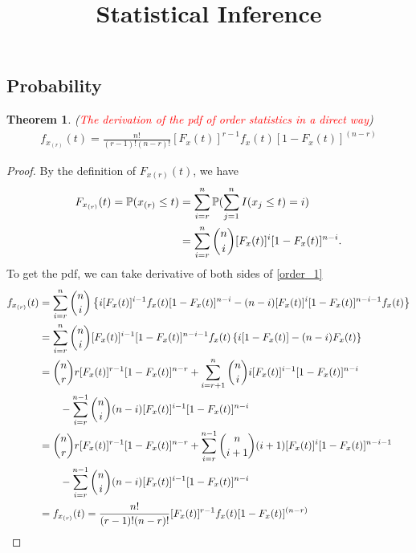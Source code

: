 \documentclass{article}
\title{\textbf{Statistical Inference}}
\author{}
\date{}
\begin{document}
\begin{CJK}{UTF8}{gbsn}

    \maketitle
    \newtheorem{Inference}{Theorem}[section]

    \section{Probability}

    \begin{Inference}
        (\textcolor{red}{\textit{The derivation of the pdf of order statistics in a direct way}})
        \begin{align}
            f_{x_{(r)}}(t)=\frac{n!}{(r-1)!(n-r)!}[F_x(t)]^{r-1}f_{x}(t)[1-F_x(t)]^{(n-r)}
        \end{align}
    \end{Inference}
    \begin{proof}
        By the definition of $F_{x(r)}(t)$, we have
        \begin{align}
            F_{x_{(r)}}(t) = \mathbb{P}(x_{(r)}\leq t) & = \sum_{i=r}^n\mathbb{P}(\sum_{j=1}^n I (x_j\leq t) = i)\notag         \\
                                                       & = \sum_{i=r}^n \binom{n}{i} [F_x(t)]^i[1-F_x(t)]^{n-i}.\label{order_1}
        \end{align}
        To get the pdf, we can take derivative of both sides of \eqref{order_1}
        \begin{align}
            f_{x_{(r)}}(t) & = \sum_{i=r}^n \binom{n}{i} \left \{ i[F_x(t)]^{i-1}f_x(t)[1-F_x(t)]^{n-i}-(n-i)[F_x(t)]^i[1-F_x(t)]^{n-i-1}f_x(t) \right \}\notag \\
                           & =\sum_{i=r}^n \binom{n}{i} [F_x(t)]^{i-1}[1-F_x(t)]^{n-i-1}f_x(t)\left \{ i[1-F_x(t)] - (n-i)F_x(t) \right \} \notag               \\
                           & = \binom{n}{r}r[F_x(t)]^{r-1}[1-F_x(t)]^{n-r} + \sum_{i=r+1}^n \binom{n}{i} i[F_x(t)]^{i-1}[1-F_x(t)]^{n-i} \notag                 \\
                           & \qquad - \sum_{i=r}^{n-1}\binom{n}{i}(n-i)[F_x(t)]^{i-1}[1-F_x(t)]^{n-i}\notag                                                     \\
                           & = \binom{n}{r}r[F_x(t)]^{r-1}[1-F_x(t)]^{n-r} + \sum_{i=r}^{n-1} \binom{n}{i+1} {(i+1)}[F_x(t)]^{i}[1-F_x(t)]^{n-i-1} \notag       \\
                           & \qquad - \sum_{i=r}^{n-1}\binom{n}{i}(n-i)[F_x(t)]^{i-1}[1-F_x(t)]^{n-i}\notag                                                     \\
                           & = f_{x_{(r)}}(t)=\frac{n!}{(r-1)!(n-r)!}[F_x(t)]^{r-1}f_{x}(t)[1-F_x(t)]^{(n-r)}\notag
        \end{align}
    \end{proof}


\end{CJK}
\end{document}
